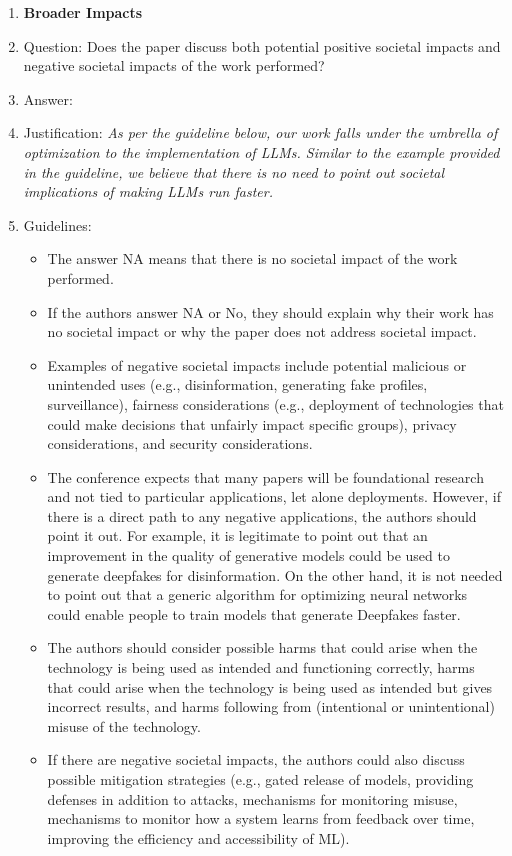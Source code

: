 \documentclass{article}
\theoremstyle{plain}
\begin{document}
\begin{enumerate}
\item {\bf Broader Impacts}
    \item[] Question: Does the paper discuss both potential positive societal impacts and negative societal impacts of the work performed?
    \item[] Answer: \answerNA %
    \item[] Justification: \textit{As per the guideline below, our work falls under the umbrella of optimization to the implementation of LLMs. Similar to the example provided in the guideline, we believe that there is no need to point out societal implications of making LLMs run faster. }
    \item[] Guidelines:
    \begin{itemize}
        \item The answer NA means that there is no societal impact of the work performed.
        \item If the authors answer NA or No, they should explain why their work has no societal impact or why the paper does not address societal impact.
        \item Examples of negative societal impacts include potential malicious or unintended uses (e.g., disinformation, generating fake profiles, surveillance), fairness considerations (e.g., deployment of technologies that could make decisions that unfairly impact specific groups), privacy considerations, and security considerations.
        \item The conference expects that many papers will be foundational research and not tied to particular applications, let alone deployments. However, if there is a direct path to any negative applications, the authors should point it out. For example, it is legitimate to point out that an improvement in the quality of generative models could be used to generate deepfakes for disinformation. On the other hand, it is not needed to point out that a generic algorithm for optimizing neural networks could enable people to train models that generate Deepfakes faster.
        \item The authors should consider possible harms that could arise when the technology is being used as intended and functioning correctly, harms that could arise when the technology is being used as intended but gives incorrect results, and harms following from (intentional or unintentional) misuse of the technology.
        \item If there are negative societal impacts, the authors could also discuss possible mitigation strategies (e.g., gated release of models, providing defenses in addition to attacks, mechanisms for monitoring misuse, mechanisms to monitor how a system learns from feedback over time, improving the efficiency and accessibility of ML).
    \end{itemize}
    

\end{enumerate}
\end{document}
